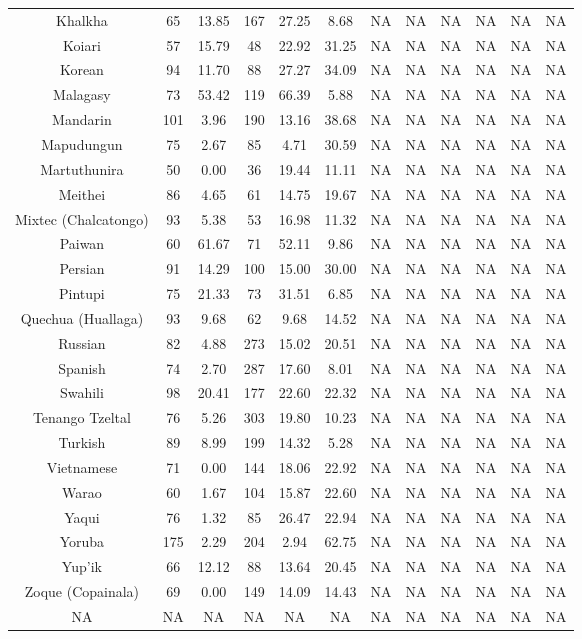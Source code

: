 \begin{tabular}{cccccccccccc}
Khalkha & 65 & 13.85 & 167 & 27.25 & 8.68 & NA & NA & NA & NA & NA & NA \\
Koiari & 57 & 15.79 & 48 & 22.92 & 31.25 & NA & NA & NA & NA & NA & NA \\
Korean & 94 & 11.70 & 88 & 27.27 & 34.09 & NA & NA & NA & NA & NA & NA \\
Malagasy & 73 & 53.42 & 119 & 66.39 & 5.88 & NA & NA & NA & NA & NA & NA \\
Mandarin & 101 & 3.96 & 190 & 13.16 & 38.68 & NA & NA & NA & NA & NA & NA \\
Mapudungun & 75 & 2.67 & 85 & 4.71 & 30.59 & NA & NA & NA & NA & NA & NA \\
Martuthunira & 50 & 0.00 & 36 & 19.44 & 11.11 & NA & NA & NA & NA & NA & NA \\
Meithei & 86 & 4.65 & 61 & 14.75 & 19.67 & NA & NA & NA & NA & NA & NA \\
Mixtec (Chalcatongo) & 93 & 5.38 & 53 & 16.98 & 11.32 & NA & NA & NA & NA & NA & NA \\
Paiwan & 60 & 61.67 & 71 & 52.11 & 9.86 & NA & NA & NA & NA & NA & NA \\
Persian & 91 & 14.29 & 100 & 15.00 & 30.00 & NA & NA & NA & NA & NA & NA \\
Pintupi & 75 & 21.33 & 73 & 31.51 & 6.85 & NA & NA & NA & NA & NA & NA \\
Quechua (Huallaga) & 93 & 9.68 & 62 & 9.68 & 14.52 & NA & NA & NA & NA & NA & NA \\
Russian & 82 & 4.88 & 273 & 15.02 & 20.51 & NA & NA & NA & NA & NA & NA \\
Spanish & 74 & 2.70 & 287 & 17.60 & 8.01 & NA & NA & NA & NA & NA & NA \\
Swahili & 98 & 20.41 & 177 & 22.60 & 22.32 & NA & NA & NA & NA & NA & NA \\
Tenango Tzeltal & 76 & 5.26 & 303 & 19.80 & 10.23 & NA & NA & NA & NA & NA & NA \\
Turkish & 89 & 8.99 & 199 & 14.32 & 5.28 & NA & NA & NA & NA & NA & NA \\
Vietnamese & 71 & 0.00 & 144 & 18.06 & 22.92 & NA & NA & NA & NA & NA & NA \\
Warao & 60 & 1.67 & 104 & 15.87 & 22.60 & NA & NA & NA & NA & NA & NA \\
Yaqui & 76 & 1.32 & 85 & 26.47 & 22.94 & NA & NA & NA & NA & NA & NA \\
Yoruba & 175 & 2.29 & 204 & 2.94 & 62.75 & NA & NA & NA & NA & NA & NA \\
Yup'ik & 66 & 12.12 & 88 & 13.64 & 20.45 & NA & NA & NA & NA & NA & NA \\
Zoque (Copainala) & 69 & 0.00 & 149 & 14.09 & 14.43 & NA & NA & NA & NA & NA & NA \\
NA & NA & NA & NA & NA & NA & NA & NA & NA & NA & NA & NA
\end{tabular}